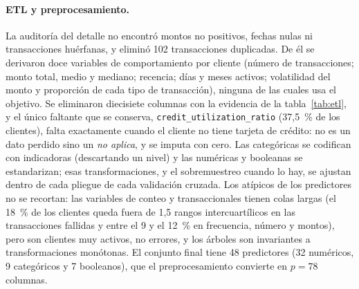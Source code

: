 \paragraph{ETL y preprocesamiento.}
La auditoría del detalle no encontró montos no positivos, fechas nulas ni transacciones huérfanas, y eliminó
102 transacciones duplicadas. De él se derivaron doce variables de comportamiento por cliente (número de
transacciones; monto total, medio y mediano; recencia; días y meses activos; volatilidad del monto y
proporción de cada tipo de transacción), ninguna de las cuales usa el objetivo. Se eliminaron diecisiete
columnas con la evidencia de la tabla~\ref{tab:etl}, y el único faltante que se conserva,
\texttt{credit\_utilization\_ratio} (37,5~\% de los clientes), falta exactamente cuando el cliente no tiene
tarjeta de crédito: no es un dato perdido sino un \emph{no aplica}, y se imputa con cero. Las categóricas se
codifican con indicadoras (descartando un nivel) y las numéricas y booleanas se estandarizan; esas
transformaciones, y el sobremuestreo cuando lo hay, se ajustan dentro de cada pliegue de cada validación
cruzada. Los atípicos de los predictores no se recortan: las variables de conteo y transaccionales tienen
colas largas (el 18~\% de los clientes queda fuera de 1,5 rangos intercuartílicos en las transacciones
fallidas y entre el 9 y el 12~\% en frecuencia, número y montos), pero son clientes muy activos, no errores,
y los árboles son invariantes a transformaciones monótonas.
El conjunto final tiene 48 predictores (32 numéricos, 9 categóricos y 7 booleanos), que el preprocesamiento
convierte en $p = 78$ columnas.

